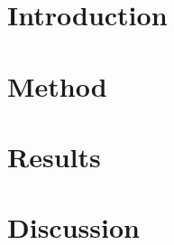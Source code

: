 
\section{Introduction} \label{sec:intro}


% 

\section{Method} \label{sec:method}


\section{Results} \label{sec:results}


\section{Discussion} \label{sec:discussion}


